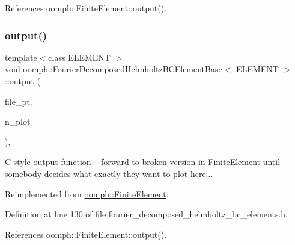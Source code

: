References oomph\+::\+Finite\+Element\+::output().

\mbox{\label{classoomph_1_1FourierDecomposedHelmholtzBCElementBase_a497d1952481a116fe68f20f5c937166b}} 
\subsubsection{\texorpdfstring{output()}{output()}\hspace{0.1cm}{\footnotesize\ttfamily [4/4]}}
{\footnotesize\ttfamily template$<$class E\+L\+E\+M\+E\+NT $>$ \\
void \hyperlink{classoomph_1_1FourierDecomposedHelmholtzBCElementBase}{oomph\+::\+Fourier\+Decomposed\+Helmholtz\+B\+C\+Element\+Base}$<$ E\+L\+E\+M\+E\+NT $>$\+::output (\begin{DoxyParamCaption}\item[{F\+I\+LE $\ast$}]{file\+\_\+pt,  }\item[{const unsigned \&}]{n\+\_\+plot }\end{DoxyParamCaption})\hspace{0.3cm}{\ttfamily [inline]}, {\ttfamily [virtual]}}



C-\/style output function -- forward to broken version in \hyperlink{classoomph_1_1FiniteElement}{Finite\+Element} until somebody decides what exactly they want to plot here... 



Reimplemented from \hyperlink{classoomph_1_1FiniteElement_adfaee690bb0608f03320eeb9d110d48c}{oomph\+::\+Finite\+Element}.



Definition at line 130 of file fourier\+\_\+decomposed\+\_\+helmholtz\+\_\+bc\+\_\+elements.\+h.



References oomph\+::\+Finite\+Element\+::output().

\mbox{\label{classoomph_1_1FourierDecomposedHelmholtzBCElementBase_a5046a85132dd8fed1199b8c55aeea030}} 
